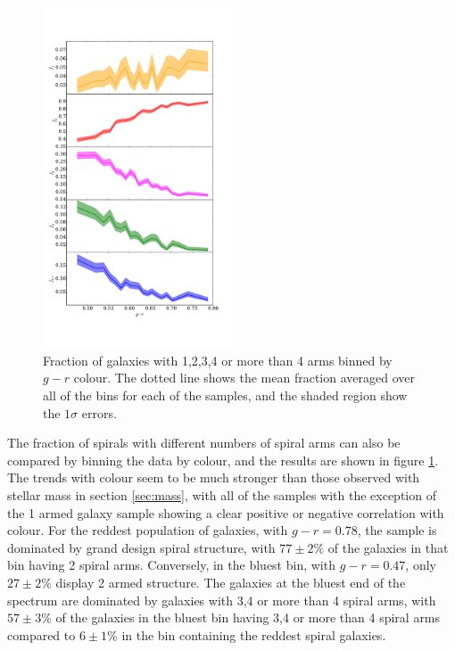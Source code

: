\documentclass[useAMS,usenatbib]{mn2e}
\begin{document}
\begin{figure}
		\centering
		
        \includegraphics[width=0.5\textwidth]{Data_imgs/colour_plot.pdf}
		
        \caption{Fraction of galaxies with 1,2,3,4 or more than 4 arms binned by $g-r$ colour. The dotted line shows the mean fraction averaged over all of the bins for each of the samples, and the shaded region show the $1 \sigma$ errors.}
		
        \label{fig:colour_plot}
        
\end{figure}

The fraction of spirals with different numbers of spiral arms can also be compared by binning the data by colour, and the results are shown in figure \ref{fig:colour_plot}. The trends with colour seem to be much stronger than those observed with stellar mass in section \ref{sec:mass}, with all of the samples with the exception of the 1 armed galaxy sample showing a clear positive or negative correlation with colour. For the reddest population of galaxies, with $g-r=0.78$, the sample is dominated by grand design spiral structure, with $77 \pm 2 \%$ of the galaxies in that bin having 2 spiral arms. Conversely, in the bluest bin, with $g-r=0.47$, only $27 \pm 2 \%$ display 2 armed structure. The galaxies at the bluest end of the spectrum are dominated by galaxies with 3,4 or more than 4 spiral arms, with $57 \pm 3 \%$ of the galaxies in the bluest bin having 3,4 or more than 4 spiral arms compared to $6 \pm 1 \%$ in the bin containing the reddest spiral galaxies. 
\end{document}
